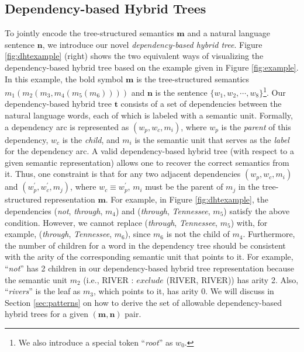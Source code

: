 \subsection{Dependency-based Hybrid Trees}
To jointly encode the tree-structured semantics $\boldsymbol{m}$ and a natural language sentence $\boldsymbol{n}$, we introduce our novel {\em dependency-based hybrid tree}. 
Figure \ref{fig:dhtexample} (right) shows the two equivalent ways of visualizing the {dependency-based hybrid tree} based on the example given in Figure \ref{fig:example}. 
In this example, the bold symbol $\boldsymbol{m}$ is the tree-structured semantics $m_1 (m_2 (m_3, m_4(m_5(m_6))))$ and $\boldsymbol{n}$ is the sentence $\{w_1, w_2, \cdots,w_8\}$\footnote{We also introduce a special token ``{\em root}'' as $w_0$.}. 
Our {dependency-based hybrid tree} $\boldsymbol{t}$ consists of a set of dependencies  between the natural language words, each of which is labeled with a semantic unit. 
Formally, a dependency arc is represented as $(w_p, w_c, m_i)$, where $w_p$ is the {\em parent} of this dependency, $w_c$ is the {\em child}, and $m_i$ is the semantic unit that serves as the {\em label} for the dependency arc. 
A valid dependency-based hybrid tree (with respect to a given semantic representation) allows one to recover the correct semantics from it.
Thus, one constraint is that for any two adjacent dependencies $(w_p, w_c, m_i)$ and $(w_p^\prime, w_c^\prime, m_j)$, where $w_c \equiv w_p^\prime$, $m_i$ must be the parent of $m_j$ in the tree-structured representation $\boldsymbol{m}$.  
For example, in Figure \ref{fig:dhtexample}, the dependencies ({\em not}, {\em through}, $m_4$) and ({\em through}, {\em Tennessee}, $m_5$) satisfy the above condition. 
However, we cannot replace ({\em through}, {\em Tennessee}, $m_5$) with, for example, ({\em through}, {\em Tennessee}, $m_6$), since $m_6$ is not the child of $m_4$. 
Furthermore, the number of children for a word in the dependency tree should be consistent with the arity of the corresponding semantic unit that points to it. 
For example, ``{\em not}'' has 2 children in our {dependency-based hybrid tree} representation because the semantic unit $m_2$ (i.e., R{\small{IVER}} : $exclude$ (R{\small{IVER}}, R{\small{IVER}})) has arity 2. 
Also, ``{\em rivers}'' is the leaf as $m_3$, which points to it, has arity 0.
We will discuss in Section \ref{sec:patterns} on how to derive the set of allowable dependency-based hybrid trees for a given $(\boldsymbol{m},\boldsymbol{n})$ pair.





